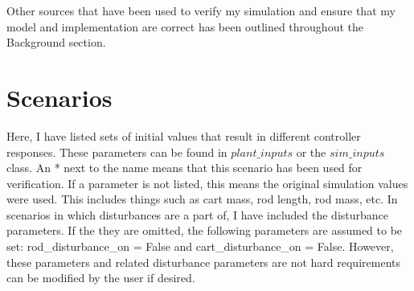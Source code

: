 \documentclass{article}
\begin{document}
Other sources that have been used to verify my simulation and ensure that my model and implementation are correct has been outlined throughout the Background section.

\section{Scenarios}

Here, I have listed sets of initial values that result in different controller responses. These parameters can be found in $plant\_inputs$ or the $sim\_inputs$ class. An * next to the name means that this scenario has been used for verification. If a parameter is not listed, this means the original simulation values were used. This includes things such as cart mass, rod length, rod mass, etc. In scenarios in which disturbances are a part of, I have included the disturbance parameters. If the they are omitted, the following parameters are assumed to be set: rod\_disturbance\_on = False and cart\_disturbance\_on = False. However, these parameters and related disturbance parameters are not hard requirements can be modified by the user if desired.
\end{document}
